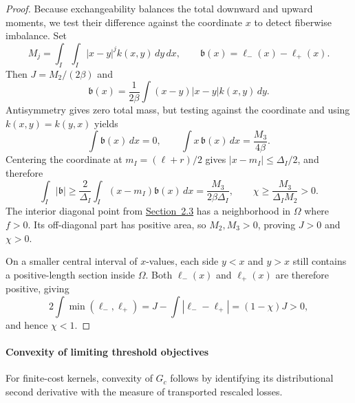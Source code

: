 \begin{proof}
Because exchangeability balances the total downward and upward moments, we test their difference against the coordinate \(x\) to detect fiberwise imbalance. Set
\begin{equation*}
M_j=\int_I\int_I|x-y|^j k(x,y)\,dy\,dx,\qquad
\mathfrak b(x)=\ell_-(x)-\ell_+(x).
\end{equation*}
Then \(J=M_2/(2\beta)\) and
\begin{equation*}
\mathfrak b(x)=\frac1{2\beta}\int(x-y)|x-y|k(x,y)\,dy.
\end{equation*}
Antisymmetry gives zero total mass, but testing against the coordinate and using \(k(x,y)=k(y,x)\) yields
\begin{equation}
\int \mathfrak b(x)\,dx=0,\qquad
\int x\,\mathfrak b(x)\,dx=\frac{M_3}{4\beta}.
\tag{A.8}\label{eq:A.8}
\end{equation}
Centering the coordinate at \(m_I=(\ell+r)/2\) gives \(|x-m_I|\le \Delta_I/2\), and therefore
\begin{equation}
\int_I|\mathfrak b|\ge\frac2{\Delta_I}\int_I(x-m_I)\mathfrak b(x)\,dx=\frac{M_3}{2\beta \Delta_I},
\qquad
\chi\ge\frac{M_3}{\Delta_IM_2}>0.
\tag{A.9}\label{eq:A.9}
\end{equation}
The interior diagonal point from \hyperref[geometry:interior-diagonal]{Section~2.3} has a neighborhood in \(\Omega\) where \(f>0\). Its off-diagonal part has positive area, so \(M_2,M_3>0\), proving \(J>0\) and \(\chi>0\).

On a smaller central interval of \(x\)-values, each side \(y<x\) and \(y>x\) still contains a positive-length section inside \(\Omega\). Both \(\ell_-(x)\) and \(\ell_+(x)\) are therefore positive, giving
\begin{equation}
2\int\min(\ell_-,\ell_+)=J-\int|\ell_--\ell_+|=(1-\chi)J>0,
\tag{A.10}\label{eq:A.10}
\end{equation}
and hence \(\chi<1\).
\end{proof}

\paragraph{Convexity of limiting threshold objectives}
\label{par:threshold-convexity}
For finite-cost kernels, convexity of \(G_c\) follows by identifying its distributional second derivative with the measure of transported rescaled losses.

